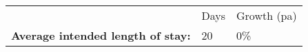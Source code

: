 \begin{tabular}[t]{p{4.8cm}>{\hfill}p{1.3cm}>{\hfill}p{1.4cm}}
   & Days & Growth (pa) \\ 
 \textbf{Average intended length of stay:} & 20 & 0\% \\ 
  \end{tabular}
